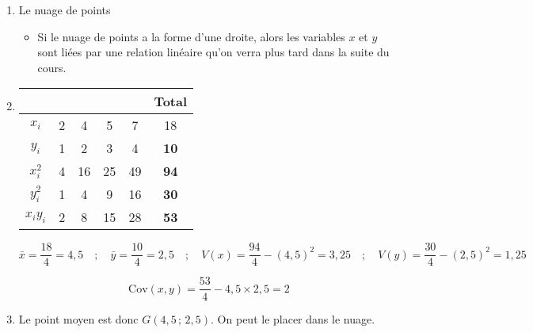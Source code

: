 \documentclass[12pt,a4paper]{article}
\begin{document}
\begin{enumerate}
    \item Le nuage de points
\begin{center}
\end{center}

\begin{itemize}
    \item Si le nuage de points a la forme d’une droite, alors les variables \( x \) et \( y \) sont liées par une relation linéaire qu’on verra plus tard dans la suite du cours.
\end{itemize}
    \item \hspace{1cm}
    \begin{center}
    \begin{tabular}{|c|c|c|c|c|c|}
    \hline
      &  &  &  &  & \textbf{Total} \\
    \hline
    \( x_i \) & 2 & 4 & 5 & 7 & 18 \\
    \hline
    \( y_i \) & 1 & 2 & 3 & 4 & \textbf{10} \\
    \hline
    \( x_i^2 \) & 4 & 16 & 25 & 49 & \textbf{94} \\
    \hline
    \( y_i^2 \) & 1 & 4 & 9 & 16 & \textbf{30} \\
    \hline
    \( x_i y_i \) & 2 & 8 & 15 & 28 & \textbf{53} \\
    \hline
    \end{tabular}
    \end{center}

    \[
    \bar{x} = \frac{18}{4} = 4{,}5 \quad ; \quad
    \bar{y} = \frac{10}{4} = 2{,}5
    \quad ; \quad
    V(x) = \frac{94}{4} - (4{,}5)^2 = 3{,}25
    \quad ; \quad
    V(y) = \frac{30}{4} - (2{,}5)^2 = 1{,}25
    \]

    \[
    \text{Cov}(x, y) = \frac{53}{4} - 4{,}5 \times 2{,}5 = 2
    \]

    \item Le point moyen est donc \( G(4{,}5 \, ; \, 2{,}5) \). On peut le placer dans le nuage.
\end{enumerate}
\end{document}

